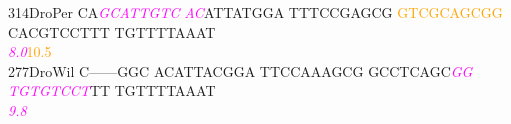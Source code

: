 \documentclass[11pt,twoside,reqno,a4paper]{article}
\begin{document}
{314\hspace*{1\charwidth}DroPer	CA\textit{\textcolor{magenta}{G}}\textit{\textcolor{magenta}{C}}\textit{\textcolor{magenta}{A}}\textit{\textcolor{magenta}{T}}\textit{\textcolor{magenta}{T}}\textit{\textcolor{magenta}{G}}\textit{\textcolor{magenta}{T}}\textit{\textcolor{magenta}{C}}	\textit{\textcolor{magenta}{A}}\textit{\textcolor{magenta}{C}}ATTATGGA	TTTCCGAGCG	\textcolor{orange}{G}\textcolor{orange}{T}\textcolor{orange}{C}\textcolor{orange}{G}\textcolor{orange}{C}\textcolor{orange}{A}\textcolor{orange}{G}\textcolor{orange}{C}\textcolor{orange}{G}\textcolor{orange}{G}	CACGTCCTTT	TGTTTTAAAT	\\
\hspace*{4\charwidth}\hspace*{7\charwidth}\hspace*{2\charwidth}\textit{\textcolor{magenta}{8.0}}\hspace*{1\charwidth}\hspace*{1\charwidth}\hspace*{1\charwidth}\hspace*{25\charwidth}\textcolor{orange}{10.5}\hspace*{1\charwidth}\hspace*{1\charwidth}\hspace*{1\charwidth}\\
277\hspace*{1\charwidth}DroWil	C------GGC	ACATTACGGA	TTCCAAAGCG	GCCTCAGC\textit{\textcolor{magenta}{G}}\textit{\textcolor{magenta}{G}}	\textit{\textcolor{magenta}{T}}\textit{\textcolor{magenta}{G}}\textit{\textcolor{magenta}{T}}\textit{\textcolor{magenta}{G}}\textit{\textcolor{magenta}{T}}\textit{\textcolor{magenta}{C}}\textit{\textcolor{magenta}{C}}\textit{\textcolor{magenta}{T}}TT	TGTTTTAAAT	\\
\hspace*{4\charwidth}\hspace*{7\charwidth}\hspace*{1\charwidth}\hspace*{1\charwidth}\hspace*{1\charwidth}\hspace*{38\charwidth}\textit{\textcolor{magenta}{9.8}}\hspace*{1\charwidth}\hspace*{1\charwidth}\hspace*{1\charwidth}\\
}
\end{document}
